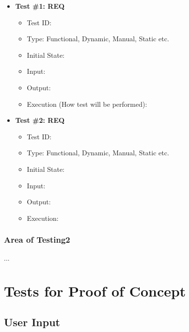 \documentclass[12pt, titlepage]{article}
\begin{document}
\begin{itemize}

\item \textbf{Test \#1: REQ}
\begin{itemize}
\item Test ID: 
\item Type: Functional, Dynamic, Manual, Static etc.				
\item Initial State: 					
\item Input: 					
\item Output: 					
\item Execution (How test will be performed): 
\end{itemize}

					
\item \textbf{Test \#2: REQ}
\begin{itemize}
\item Test ID: 
\item Type: Functional, Dynamic, Manual, Static etc.				
\item Initial State: 					
\item Input: 					
\item Output: 					
\item Execution: 
\end{itemize}

\end{itemize}
\subsubsection{Area of Testing2}
...


\section{Tests for Proof of Concept}

\subsection{User Input}
		
\end{document}
